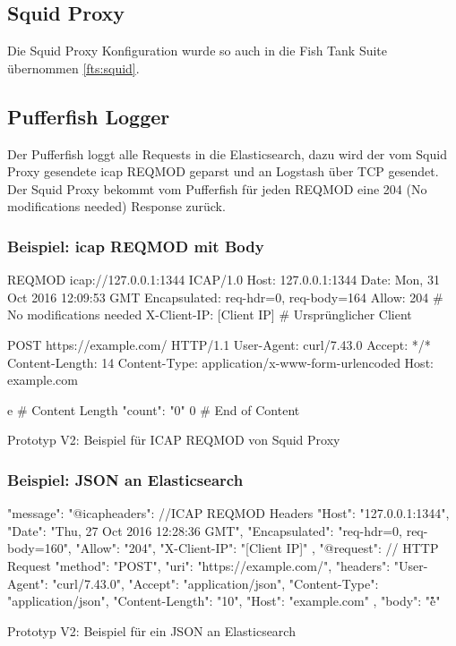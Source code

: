 \subsection{Squid Proxy}
Die Squid Proxy Konfiguration wurde so auch in die Fish Tank Suite übernommen \ref{fts:squid}.

\subsection{Pufferfish Logger}
Der Pufferfish loggt alle Requests in die Elasticsearch, dazu wird der vom Squid Proxy gesendete \gls{icap} REQMOD geparst und an Logstash über TCP gesendet.
Der Squid Proxy bekommt vom Pufferfish für jeden REQMOD eine 204 (No modifications needed) Response zurück. \\

\begin{listing}[H]
\subsubsection{Beispiel: \gls{icap} REQMOD mit Body}
\begin{fancycode}
REQMOD icap://127.0.0.1:1344 ICAP/1.0
Host: 127.0.0.1:1344
Date: Mon, 31 Oct 2016 12:09:53 GMT
Encapsulated: req-hdr=0, req-body=164
Allow: 204 # No modifications needed
X-Client-IP: [Client IP] # Ursprünglicher Client

POST https://example.com/ HTTP/1.1
User-Agent: curl/7.43.0
Accept: */*
Content-Length: 14
Content-Type: application/x-www-form-urlencoded
Host: example.com

e # Content Length
{"count": "0"}
0 # End of Content


\end{fancycode}
\caption{Prototyp V2: Beispiel für ICAP REQMOD von Squid Proxy}
\label{lst:icap-reqmod}
\end{listing}


\begin{listing}[H]
\subsubsection{Beispiel: JSON an Elasticsearch} 
\begin{jscode}
{
  "message": {
    "@icapheaders": { //ICAP REQMOD Headers
      "Host": "127.0.0.1:1344",
      "Date": "Thu, 27 Oct 2016 12:28:36 GMT",
      "Encapsulated": "req-hdr=0, req-body=160",
      "Allow": "204",
      "X-Client-IP": "[Client IP]"
    },
    "@request": { // HTTP Request
      "method": "POST",
      "uri": "https://example.com/",
      "headers": {
        "User-Agent": "curl/7.43.0",
        "Accept": "application/json",
        "Content-Type": "application/json",
        "Content-Length": "10",
        "Host": "example.com"
      },
      "body": "e\r{}\r{}\r\n\r\n"
    }
  }
}
\end{jscode}
\caption{Prototyp V2: Beispiel für ein JSON an Elasticsearch}
\label{lst:pufferfish-json}
\end{listing}

